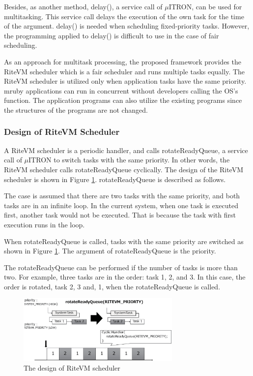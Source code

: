 \documentclass{sig-alternate-05-2015}
\begin{document}
Besides, as another method, {\myit delay()}, a service call of $\mu$ITRON, can be used for multitasking.
This service call delays the execution of the own task for the time of the argument.
{\myit delay()} is needed when scheduling fixed-priority tasks.
However, the programming applied to {\myit delay()} is difficult to use in the case of fair scheduling.

As an approach for multitask processing, the proposed framework provides the RiteVM scheduler which is a fair scheduler and runs multiple tasks equally.
The RiteVM scheduler is utilized only when application tasks have the same priority.
mruby applications can run in concurrent without developers calling the OS's function.
The application programs can also utilize the existing programs since the structures of the programs are not changed. 

\subsubsection{Design of RiteVM Scheduler}
A RiteVM scheduler is a periodic handler, and calls {\myit rotateReadyQueue}, a service call of $\mu$ITRON to switch tasks with the same priority.
In other words, the RiteVM scheduler calls {\myit rotateReadyQueue} cyclically.
The design of the RiteVM scheduler is shown in Figure \ref{fig:rotateReadyQueue}. 
{\myit rotateReadyQueue} is described as follows.

The case is assumed that there are two tasks with the same priority, and both tasks are in an infinite loop.
In the current system, when one task is executed first, another task would not be executed.
That is because the task with first execution runs in the loop.

When {\myit rotateReadyQueue} is called, tasks with the same priority are switched as shown in Figure \ref{fig:rotateReadyQueue}.
The argument of {\myit rotateReadyQueue} is the priority.

The {\myit rotateReadyQueue} can be performed if the number of tasks is more than two.
For example, three tasks are in the order: task 1, 2, and 3.
In this case, the order is rotated, task 2, 3 and, 1, when the {\myit rotateReadyQueue} is called.

\begin{figure}[t]
    \centering
    \includegraphics[width=8cm,clip]{figure/rotateReadyQueue.eps}
    \caption{The design of RiteVM scheduler}
    \label{fig:rotateReadyQueue}
\end{figure} 
 
\end{document}
